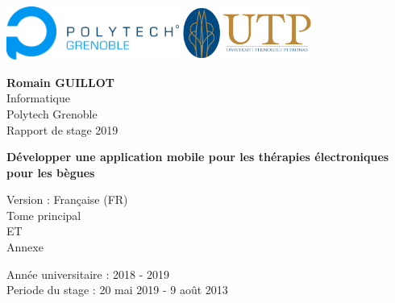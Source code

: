 \begin{titlepage}
    \begin{center}

      \includegraphics[height=1.75cm]{polytech_logo.png}%
      \hfill%
      \hfill%
      \includegraphics[height=1.75cm]{utp_logo.png}%

        \vspace{3cm}

        \large
        \textbf{Romain GUILLOT} \\
        Informatique \\
        Polytech Grenoble \\
        Rapport de stage 2019

        \vspace{2.5cm}

        \huge
        \textbf{Développer une application mobile pour les thérapies électroniques pour les bègues}

        \vspace{0.5cm}
        \large Version : Française (FR)\\
        \vspace{2.5cm}
        \large Tome principal \\
        \small ET \\
        \large Annexe


        \vfill

        \large
        Année universitaire : 2018 - 2019\\
        Periode du stage : 20 mai 2019 - 9 août 2013

    \end{center}
\end{titlepage}
